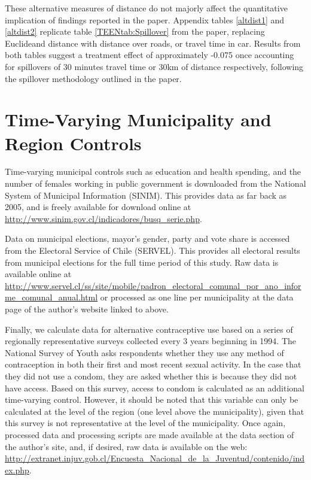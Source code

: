 \documentclass[11pt,subeqn]{article}
\begin{document}
\begin{spacing}{1.4}
These alternative measures of distance do not majorly affect the quantitative 
implication of findings reported in the paper.  Appendix tables \ref{altdist1}
and \ref{altdist2} replicate table \ref{TEENtab:Spillover} from the paper,
replacing Euclideand distance with distance over roads, or travel time in 
car. Results from both tables suggest a treatment effect of approximately 
-0.075 once accounting for spillovers of 30 minutes travel time or 30km of 
distance respectively, following the spillover methodology outlined in the
paper.







\clearpage
\section{Time-Varying Municipality and Region Controls}
Time-varying municipal controls such as education and health spending, and the
number of females working in public government is downloaded from the National
System of Municipal Information (SINIM).  This provides data as far back as
2005, and is freely available for download online at
\url{http://www.sinim.gov.cl/indicadores/busq_serie.php}.

Data on municipal elections, mayor's gender, party and vote share is accessed
from the Electoral Service of Chile (SERVEL).  This provides all electoral
results from municipal elections for the full time period of this study.  Raw
data is available online at 
\url{http://www.servel.cl/ss/site/mobile/padron_electoral_comunal_por_ano_informe_comunal_anual.html}
or processed as one line per municipality at the data page of the author's
website linked to above.

Finally, we calculate data for alternative contraceptive use based on
a series of regionally representative surveys collected every 3 years beginning
in 1994.  The National Survey of Youth asks respondents whether they use any 
method of contraception in both their first and most recent sexual activity.  
In the case that they did not use a condom, they are asked whether this is 
because they did not have access.  Based on this survey, access to condom is
calculated as an additional time-varying control.  However, it should be noted
that this variable can only be calculated at the level of the region (one 
level above the municipality), given that this survey is not representative at 
the level of the municipality.  Once again, processed data and processing 
scripts are made available at the data section of the author's site, and, if 
desired, raw data is available on the web: 
\url{http://extranet.injuv.gob.cl/Encuesta_Nacional_de_la_Juventud/contenido/index.php}.





\end{spacing}
\end{document}
